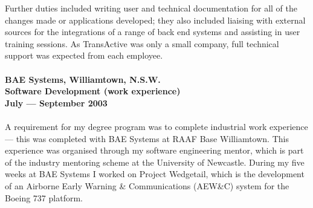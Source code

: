 \documentclass[a4paper]{article}
\begin{document}
Further duties included writing user and technical documentation for all of the changes made or applications developed; they also included liaising with external sources for the integrations of a range of back end systems and assisting in user training sessions. As TransActive was only a small company, full technical support was expected from each employee.\\\\
\textbf{BAE Systems, Williamtown, N.S.W.\\Software Development (work experience)\\July --- September 2003}\\\\
A requirement for my degree program was to complete industrial work experience --- this was completed with BAE Systems at RAAF Base Williamtown. This experience was organised through my software engineering mentor, which is part of the industry mentoring scheme at the University of Newcastle. During my five weeks at BAE Systems I worked on Project Wedgetail, which is the development of an Airborne Early Warning \& Communications (AEW\&C) system for the Boeing 737 platform.
\newpage
\ryanHeader
\end{document}
